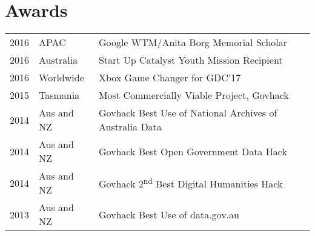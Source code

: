 \documentclass[a4paper]{deedy-resume} %
\begin{document}
\begin{minipage}[t]{0.66\textwidth}
\sectionspace %

\sectionspace
\section{Awards}

\begin{tabular}{rll}
2016	 & APAC & Google WTM/Anita Borg Memorial Scholar\\
2016	 & Australia & Start Up Catalyst Youth Mission Recipient \\
2016	 & Worldwide & Xbox Game Changer for GDC'17\\
2015	 & Tasmania & Most Commercially Viable Project, Govhack\\
2014	 & Aus and NZ & Govhack Best Use of National Archives of Australia Data \\
2014	 & Aus and NZ & Govhack Best Open Government Data Hack \\
2014	 & Aus and NZ & Govhack 2\textsuperscript{nd} Best Digital Humanities Hack \\
2013	 & Aus and NZ & Govhack Best Use of data.gov.au \\
\end{tabular}

\sectionspace %


\end{minipage} %

\end{document}
